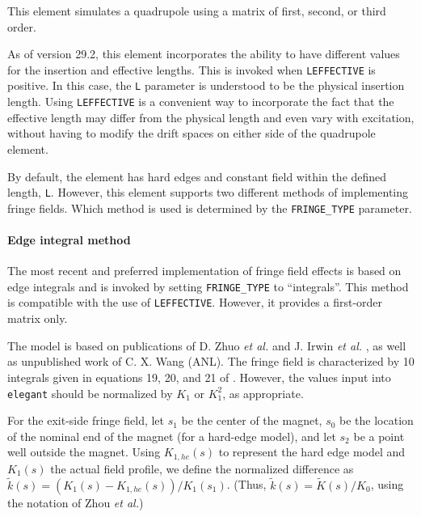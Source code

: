 This element simulates a quadrupole using a matrix of first, second,
or third order.

As of version 29.2, this element incorporates the ability to have different values for the insertion
and effective lengths. This is invoked when \verb|LEFFECTIVE| is positive. In this case, the
\verb|L| parameter is understood to be the physical insertion length. Using \verb|LEFFECTIVE| is
a convenient way to incorporate the fact that the effective length may differ from the physical
length and even vary with excitation, without having to modify the drift spaces on either side of
the quadrupole element.

By default, the element has hard edges and constant field within the
defined length, {\tt L}.  However, this element supports two different methods of implementing fringe fields.
Which method is used is determined by the \verb|FRINGE_TYPE| parameter.

\paragraph{Edge integral method} The most recent and preferred implementation of fringe field effects is based on edge
integrals and is invoked by setting \verb|FRINGE_TYPE| to ``integrals''.  This method is compatible with the use of
\verb|LEFFECTIVE|. However, it provides a first-order matrix only.

The model is based on publications of D.  Zhuo {\em et al.} \cite{Zhou-IPAC10} and  J. Irwin {\em et
  al.} \cite{Irwin-PAC95}, as well as unpublished work of C. X. Wang (ANL).  The fringe field is characterized by 
10 integrals given in equations 19, 20, and 21 of \cite{Zhou-IPAC10}.  However, the values input into {\tt elegant}
should be normalized by $K_1$ or $K_1^2$, as appropriate.

For the exit-side fringe field, let $s_1$ be the center of the magnet, $s_0$ be the location of the nominal end of the magnet
(for a hard-edge model), and let $s_2$ be a point well outside the magnet.  
Using $K_{1,he}(s)$ to represent the hard edge model and $K_1(s)$ the actual field profile, we 
define the normalized difference as $\tilde{k}(s) = (K_1(s) - K_{1,he}(s))/K_1(s_1)$.  (Thus, $\tilde{k}(s) = \tilde{K}(s)/K_0$, using
the notation of Zhou {\em et al.})

